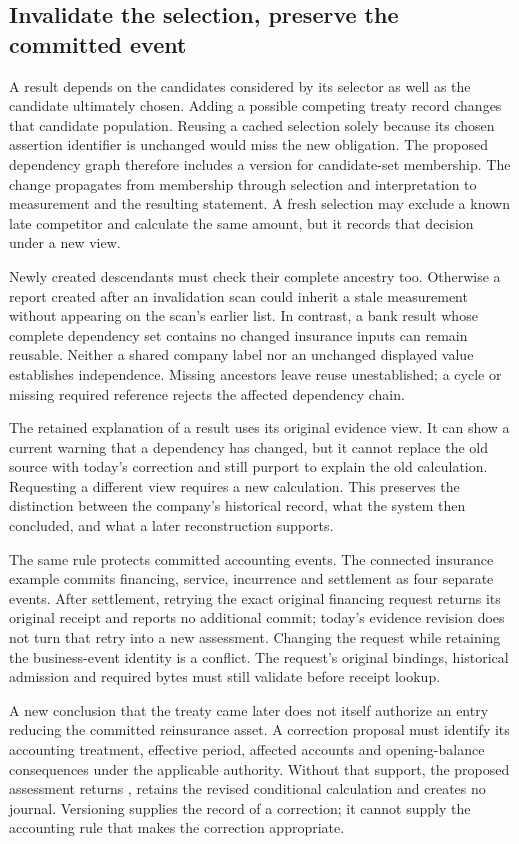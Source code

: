 \subsection*{Invalidate the selection, preserve the committed event}

A result depends on the candidates considered by its selector as well as
the candidate ultimately chosen. Adding a possible competing treaty record
changes that candidate population. Reusing a cached selection solely
because its chosen assertion identifier is unchanged would miss the new
obligation. The proposed dependency graph therefore includes a version for
candidate-set membership. The change propagates from membership through
selection and interpretation to measurement and the resulting statement.
A fresh selection may exclude a known late competitor and calculate the
same amount, but it records that decision under a new view.

Newly created descendants must check their complete ancestry too. Otherwise
a report created after an invalidation scan could inherit a stale measurement
without appearing on the scan's earlier list. In contrast, a bank result whose
complete dependency set contains no changed insurance inputs can remain
reusable. Neither a shared company label nor an unchanged displayed value
establishes independence. Missing ancestors leave reuse unestablished; a
cycle or missing required reference rejects the affected dependency chain.

The retained explanation of a result uses its original evidence view.
It can show a current warning that a dependency has changed, but it cannot
replace the old source with today's correction and still purport to explain
the old calculation. Requesting a different view requires a new calculation.
This preserves the distinction between the company's historical record,
what the system then concluded, and what a later reconstruction supports.

The same rule protects committed accounting events. The connected insurance
example commits financing, service, incurrence and settlement as four
separate events. After settlement, retrying the exact original financing
request returns its original receipt and reports no additional commit;
today's evidence revision does not turn that retry into a new assessment.
Changing the request while retaining the business-event identity is a
conflict. The request's original bindings, historical admission and required
bytes must still validate before receipt lookup.

A new conclusion that the treaty came later does not itself authorize an
entry reducing the committed reinsurance asset. A correction proposal must
identify its accounting treatment, effective period, affected accounts and
opening-balance consequences under the applicable authority. Without that
support, the proposed assessment returns ,
retains the revised conditional calculation and creates no journal.
Versioning supplies the record of a correction; it cannot supply the
accounting rule that makes the correction appropriate.
